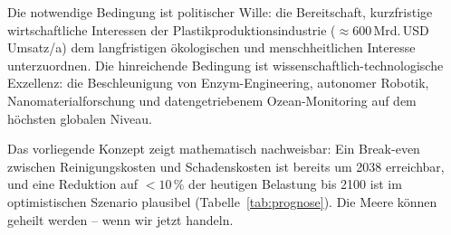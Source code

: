 ﻿\documentclass[12pt,a4paper]{article}
\theoremstyle{definition}
\theoremstyle{remark}
\begin{document}
Die notwendige Bedingung ist politischer Wille: die Bereitschaft,
kurzfristige wirtschaftliche Interessen der Plastikproduktionsindustrie
($\approx 600$\,Mrd.\,USD\,Umsatz/a) dem langfristigen \"okologischen
und menschheitlichen Interesse unterzuordnen. Die hinreichende Bedingung
ist wissenschaftlich-technologische Exzellenz: die Beschleunigung von
Enzym-Engineering, autonomer Robotik, Nanomaterialforschung und
datengetriebenem Ozean-Monitoring auf dem h\"ochsten globalen Niveau.

Das vorliegende Konzept zeigt mathematisch nachweisbar: Ein Break-even
zwischen Reinigungskosten und Schadenskosten ist bereits um 2038 erreichbar,
und eine Reduktion auf $< 10\,\%$ der heutigen Belastung bis 2100 ist im
optimistischen Szenario plausibel (Tabelle~\ref{tab:prognose}).
Die Meere k\"onnen geheilt werden -- wenn wir jetzt handeln.
\end{document}
